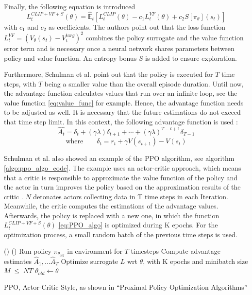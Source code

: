 Finally, the following equation is introduced
\begin{equation}\label{eq:PPO_algo}
    L_{t}^{CLIP+VF+S}(\theta) = \hat{\mathbb{E}}_{t} \left[ L_{t}^{CLIP}(\theta) - c_{1}L_{t}^{VF}(\theta) + c_{2}S[\pi_{\theta}](s_{t}) \right]
\end{equation}
with $c_{1}$ and $c_{2}$ as coefficients. The authors point out that the loss function \\
$L_{t}^{VF} = (V_{\theta}(s_{t})-V_{t}^{targ})^2$ combines the policy surrogate and the value function error term and is necessary once a neural network shares parameters between policy and value function. An entropy bonus $S$ is added to ensure exploration.

Furthermore, Schulman et al. point out that the policy is executed for $T$ time steps, with $T$ being a smaller value than the overall episode duration. Until now, the advantage function calculates values that run over an infinite loop, see the value function \eqref{eq:value_func} for example. Hence, the advantage function needs to be adjusted as well. It is necessary that the future estimations do not exceed that time step limit. In this context, the following advantage function is used \cite{scwo17}:
\begin{equation}\label{eq:advantage_func}
    \hat{A_t} = \delta_t+(\gamma \lambda)\delta_{t+1}+ \cdots + (\gamma \lambda)^{T-t+1}\delta_{T-1}
\end{equation}
\begin{equation}\label{eq:advantage_func_delta}
    \textrm{where} \qquad \delta_t = r_t + \gamma V(s_{t+1}) - V(s_t)
\end{equation}

Schulman et al. also showed an example of the PPO algorithm, see algorithm \ref{algo:ppo_algo_code}. The example uses an actor-critic approach, which means that a critic is responsible to approximate the value function of the policy and the actor in turn improves the policy based on the approximation results of the critic \cite{kots03}. $N$ detonates actors collecting data in T time steps in each Iteration. Meanwhile, the critic computes the estimations of the advantage values. Afterwards, the policy is replaced with a new one, in which the function $L_{t}^{CLIP+VF+S}(\theta)$ \eqref{eq:PPO_algo} is optimized during K epochs. For the optimization process, a small random batch of the previous time steps is used.

\begin{algorithm}[H]
    \DontPrintSemicolon
    \For(){}{
        \For(){}{
            Run policy $\pi_{\theta_{old}}$ in environment for $T$ timesteps \;
            Compute advantage estimates $\hat{A}_{1},...\hat{A}_{T}$
        }
        Optimize surrogate $L$ wrt $\theta$, with K epochs and minibatch size $M \; \leq \; NT$ \;
        $\theta_{old} \leftarrow \theta$
    }
    \caption{PPO, Actor-Critic Style, as shown in ``Proximal Policy Optimization Algorithms'' \cite{scwo17}}\label{algo:ppo_algo_code}
\end{algorithm}

